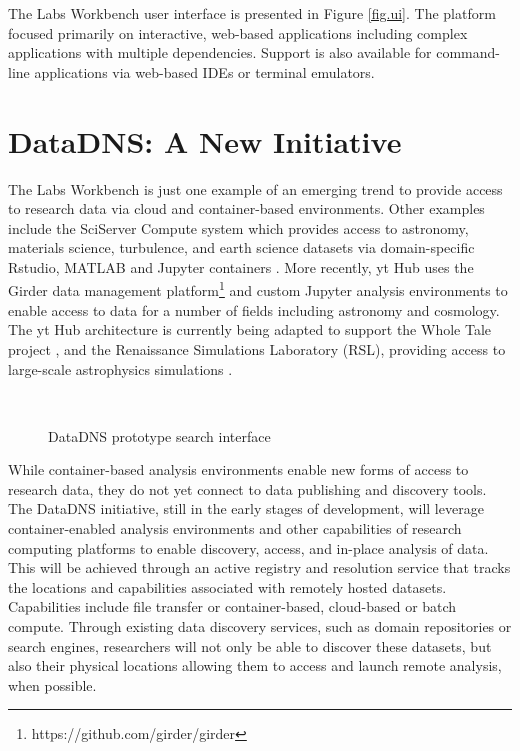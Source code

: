 \documentclass{sig-alternate}
\begin{document}
The Labs Workbench user interface is presented in Figure \ref{fig.ui}.  The platform focused primarily on interactive, web-based applications including complex applications with multiple dependencies. Support is also available for command-line applications via web-based IDEs or terminal emulators.  

\section{DataDNS: A New Initiative}

The Labs Workbench is just one example of an emerging trend to provide access to research data via cloud and container-based environments.  Other examples include the SciServer Compute system which provides access to astronomy, materials science, turbulence, and earth science datasets via domain-specific Rstudio, MATLAB and Jupyter containers \cite{Medvedev:2016:SCB:2949689.2949700}.  More recently, yt Hub \cite{zuhone2016galaxy} uses the Girder data management platform\footnote{https://github.com/girder/girder} and custom Jupyter analysis environments to enable access to data for a number of fields including astronomy and cosmology. The yt Hub architecture is currently being adapted to support the Whole Tale project \cite{ludaescher2016capturing}, and the Renaissance Simulations Laboratory (RSL), providing access to large-scale astrophysics simulations \cite{2041-8205-807-1-L12}.

\begin{figure}[!ht]
\\
\vspace{-0.1in}
\caption{DataDNS prototype search interface}
\label{fig.datadns}
\end{figure}

While container-based analysis environments enable new forms of access to research data, they do not yet connect to data publishing and discovery tools.  The DataDNS initiative, still in the early stages of development, will leverage container-enabled analysis environments and other capabilities of research computing platforms to enable discovery, access, and in-place analysis of data.  This will be achieved through an active registry and resolution service that tracks the locations and capabilities associated with remotely hosted datasets. Capabilities include file transfer or container-based, cloud-based or batch compute. Through existing data discovery services, such as domain repositories or search engines, researchers will not only be able to discover these datasets, but also their physical locations allowing them to access and launch remote analysis, when possible.   
\end{document}
